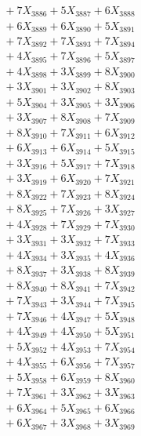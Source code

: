 \documentclass[a4paper,10pt]{article}
\begin{document}
{\begin{align}
&\;  + 7 X_{3886} + 5 X_{3887} + 6 X_{3888} \\[0.3ex]
&\;  + 6 X_{3889} + 6 X_{3890} + 5 X_{3891} \\[0.3ex]
&\;  + 7 X_{3892} + 7 X_{3893} + 7 X_{3894} \\[0.3ex]
&\;  + 4 X_{3895} + 7 X_{3896} + 5 X_{3897} \\[0.3ex]
&\;  + 4 X_{3898} + 3 X_{3899} + 8 X_{3900} \\[0.3ex]
&\;  + 3 X_{3901} + 3 X_{3902} + 8 X_{3903} \\[0.3ex]
&\;  + 5 X_{3904} + 3 X_{3905} + 3 X_{3906} \\[0.3ex]
&\;  + 3 X_{3907} + 8 X_{3908} + 7 X_{3909} \\[0.5ex]\allowbreak
&\;  + 8 X_{3910} + 7 X_{3911} + 6 X_{3912} \\[0.3ex]
&\;  + 6 X_{3913} + 6 X_{3914} + 5 X_{3915} \\[0.3ex]
&\;  + 3 X_{3916} + 5 X_{3917} + 7 X_{3918} \\[0.3ex]
&\;  + 3 X_{3919} + 6 X_{3920} + 7 X_{3921} \\[0.3ex]
&\;  + 8 X_{3922} + 7 X_{3923} + 8 X_{3924} \\[0.3ex]
&\;  + 8 X_{3925} + 7 X_{3926} + 3 X_{3927} \\[0.3ex]
&\;  + 4 X_{3928} + 7 X_{3929} + 7 X_{3930} \\[0.3ex]
&\;  + 3 X_{3931} + 3 X_{3932} + 7 X_{3933} \\[0.3ex]
&\;  + 4 X_{3934} + 3 X_{3935} + 4 X_{3936} \\[0.3ex]
&\;  + 8 X_{3937} + 3 X_{3938} + 8 X_{3939} \\[0.5ex]\allowbreak
&\;  + 8 X_{3940} + 8 X_{3941} + 7 X_{3942} \\[0.3ex]
&\;  + 7 X_{3943} + 3 X_{3944} + 7 X_{3945} \\[0.3ex]
&\;  + 7 X_{3946} + 4 X_{3947} + 5 X_{3948} \\[0.3ex]
&\;  + 4 X_{3949} + 4 X_{3950} + 5 X_{3951} \\[0.3ex]
&\;  + 5 X_{3952} + 4 X_{3953} + 7 X_{3954} \\[0.3ex]
&\;  + 4 X_{3955} + 6 X_{3956} + 7 X_{3957} \\[0.3ex]
&\;  + 5 X_{3958} + 6 X_{3959} + 8 X_{3960} \\[0.3ex]
&\;  + 7 X_{3961} + 3 X_{3962} + 3 X_{3963} \\[0.3ex]
&\;  + 6 X_{3964} + 5 X_{3965} + 6 X_{3966} \\[0.3ex]
&\;  + 6 X_{3967} + 3 X_{3968} + 3 X_{3969} \\[0.5ex]\allowbreak

\end{align}}
\end{document}
